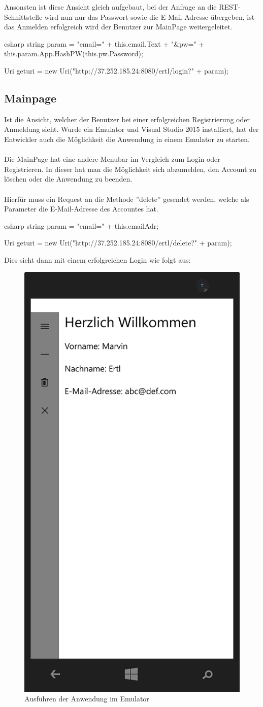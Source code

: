 Ansonsten ist diese Ansicht gleich aufgebaut, bei der Anfrage an die REST-Schnittstelle wird nun nur das Passwort sowie die E-Mail-Adresse übergeben, ist das Anmelden erfolgreich wird der Benutzer zur MainPage weitergeleitet.

\begin{code}{csharp}
	string param = "email=" + this.email.Text + "&pw=" + this.param.App.HashPW(this.pw.Password);
	
	Uri geturi = new Uri("http://37.252.185.24:8080/ertl/login?" + param);
\end{code}

\subsection{Mainpage}

Ist die Ansicht, welcher der Benutzer bei einer erfolgreichen Registrierung oder Anmeldung sieht. Wurde ein Emulator und Visual Studio 2015 installiert, hat der Entwickler auch die Möglichkeit die Anwendung in einem Emulator zu starten.
\\\\
Die MainPage hat eine andere Menubar im Vergleich zum Login oder Registrieren. In dieser hat man die Möglichkeit sich abzumelden, den Account zu löschen oder die Anwendung zu beenden.
\\\\
Hierfür muss ein Request an die Methode ''delete'' gesendet werden, welche als Parameter die E-Mail-Adresse des Accountes hat.

\begin{code}{csharp}
	string param = "email=" + this.emailAdr;
	
	Uri geturi = new Uri("http://37.252.185.24:8080/ertl/delete?" + param);
\end{code}

Dies sieht dann mit einem erfolgreichen Login wie folgt aus:

\begin{figure}[H]
	\centering
	\includegraphics[width=0.3\linewidth]{images/screenshot006}
	\caption{Ausführen der Anwendung im Emulator}
	\label{fig:screenshot006}
\end{figure}


